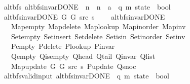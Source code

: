 \begin{isabellebody}
\isanewline
{}\isamarkupfalse%
\ {\isacharparenleft}{\kern0pt}\ alt{\isacharunderscore}{\kern0pt}bfs{\isacharparenright}{\kern0pt}\ alt{\isacharunderscore}{\kern0pt}bfs{\isacharunderscore}{\kern0pt}invar{\isacharunderscore}{\kern0pt}DONE{\isacharprime}{\kern0pt}\ {\isacharcolon}{\kern0pt}{\isacharcolon}{\kern0pt}\ {\isachardoublequoteopen}{\isacharprime}{\kern0pt}n\ {\isasymRightarrow}\ {\isacharprime}{\kern0pt}n\ {\isasymRightarrow}\ {\isacharprime}{\kern0pt}a\ {\isasymRightarrow}\ {\isacharparenleft}{\kern0pt}{\isacharprime}{\kern0pt}q{\isacharcomma}{\kern0pt}\ {\isacharprime}{\kern0pt}m{\isacharparenright}{\kern0pt}\ state\ {\isasymRightarrow}\ bool{\isachardoublequoteclose}\ \isanewline
\ \ {\isachardoublequoteopen}alt{\isacharunderscore}{\kern0pt}bfs{\isacharunderscore}{\kern0pt}invar{\isacharunderscore}{\kern0pt}DONE{\isacharprime}{\kern0pt}\ G{}\ G{}\ src\ s\ {\isasymequiv}\isanewline
\ \ \ alt{\isacharunderscore}{\kern0pt}bfs{\isacharunderscore}{\kern0pt}invar{\isacharunderscore}{\kern0pt}DONE\isanewline
\ \ \ \ Map{\isacharunderscore}{\kern0pt}empty\ Map{\isacharunderscore}{\kern0pt}delete\ Map{\isacharunderscore}{\kern0pt}lookup\ Map{\isacharunderscore}{\kern0pt}inorder\ Map{\isacharunderscore}{\kern0pt}inv\isanewline
\ \ \ \ Set{\isacharunderscore}{\kern0pt}empty\ Set{\isacharunderscore}{\kern0pt}insert\ Set{\isacharunderscore}{\kern0pt}delete\ Set{\isacharunderscore}{\kern0pt}isin\ Set{\isacharunderscore}{\kern0pt}inorder\ Set{\isacharunderscore}{\kern0pt}inv\isanewline
\ \ \ \ P{\isacharunderscore}{\kern0pt}empty\ P{\isacharunderscore}{\kern0pt}delete\ P{\isacharunderscore}{\kern0pt}lookup\ P{\isacharunderscore}{\kern0pt}invar\isanewline
\ \ \ \ Q{\isacharunderscore}{\kern0pt}empty\ Q{\isacharunderscore}{\kern0pt}is{\isacharunderscore}{\kern0pt}empty\ Q{\isacharunderscore}{\kern0pt}head\ Q{\isacharunderscore}{\kern0pt}tail\ Q{\isacharunderscore}{\kern0pt}invar\ Q{\isacharunderscore}{\kern0pt}list\isanewline
\ \ \ \ Map{\isacharunderscore}{\kern0pt}update\ G{}\ G{}\ src\ s\ P{\isacharunderscore}{\kern0pt}update\ Q{\isacharunderscore}{\kern0pt}snoc{\isachardoublequoteclose}\isanewline
\isanewline
{}\isamarkupfalse%
\ {\isacharparenleft}{\kern0pt}\ alt{\isacharunderscore}{\kern0pt}bfs{\isacharunderscore}{\kern0pt}valid{\isacharunderscore}{\kern0pt}input{\isacharparenright}{\kern0pt}\ alt{\isacharunderscore}{\kern0pt}bfs{\isacharunderscore}{\kern0pt}invar{\isacharunderscore}{\kern0pt}DONE{\isacharprime}{\kern0pt}{\isacharprime}{\kern0pt}\ {\isacharcolon}{\kern0pt}{\isacharcolon}{\kern0pt}\ {\isachardoublequoteopen}{\isacharparenleft}{\kern0pt}{\isacharprime}{\kern0pt}q{\isacharcomma}{\kern0pt}\ {\isacharprime}{\kern0pt}m{\isacharparenright}{\kern0pt}\ state\ {\isasymRightarrow}\ bool{\isachardoublequoteclose}\ \isanewline

\end{isabellebody}
